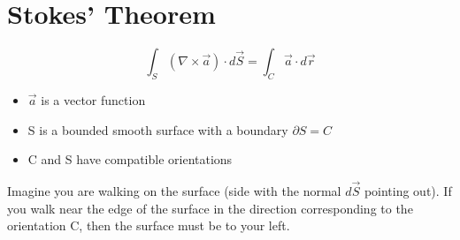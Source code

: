 \documentclass[a4paper, 11pt, normalem]{report}
\newcommand\p{\partial}
\newcommand\vs{\vec{S}}
\newcommand\va{\vec{a}}
\begin{document}
\section{Stokes' Theorem}
\begin{equation*}
    \int_S (\nabla \times \vec{a})\cdot d\vec{S} = \int_C \vec{a} \cdot d\vec{r}
\end{equation*}
\begin{itemize}
    \item $\va$ is a vector function
    \item S is a bounded smooth surface with a boundary $\p S = C$
    \item C and S have compatible orientations
\end{itemize}
Imagine you are walking on the surface (side with the normal $d\vs$ pointing out).
If you walk near the edge of the surface in the direction corresponding to the orientation C, then the surface must be to your left.
\end{document}
